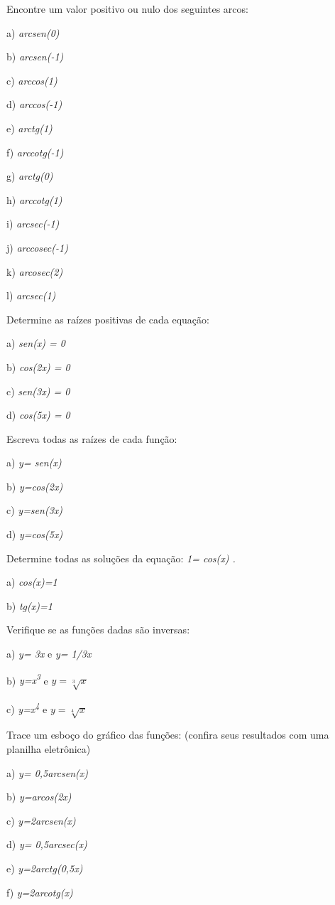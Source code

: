 \begin{exercicios}
\exitem{} Encontre um valor positivo ou nulo dos seguintes arcos:

\begin{multicols}{3}
a) \textit{arcsen(0)}

b) \textit{arcsen(-1)}

c) \textit{arccos(1)}

d) \textit{arccos(-1)}

e) \textit{arctg(1)}

f) \textit{arccotg(-1)}

g) \textit{arctg(0)}

h) \textit{arccotg(1)}

i) \textit{arcsec(-1)}

j) \textit{arccosec(-1)}

k) \textit{arcosec(2)}

l) \textit{arcsec(1)}
\end{multicols}

\exitem{} Determine as raízes positivas de cada equação:

a) \textit{sen(x) = 0}

b) \textit{cos(2x) = 0}

c) \textit{sen(3x) = 0}

d) \textit{cos(5x) = 0}

\exitem{} Escreva todas as raízes de cada função:

a)\textit{ y= sen(x)}

b)\textit{ y=cos(2x)}

c)\textit{ y=sen(3x)}

d)\textit{ y=cos(5x)}

\exitem{} Determine todas as soluções da equação: \textit{1= cos(x) .}

a)\textit{ cos(x)=1}

b)\textit{ tg(x)=1 }

\exitem{} Verifique se as funções dadas são inversas:

 a) \textit{y= 3x} e \textit{y= 1/3x  }
 
 b) \textit{y=x\textsuperscript{3}} e \(y=\sqrt[3]{x} \)
 
 c) \textit{y=x\textsuperscript{4}} e \( y=\sqrt[4]{x} \)  

\item Trace um esboço do gráfico das funções: (confira seus resultados com uma planilha eletrônica)

\begin{multicols}{2}
a) \textit{y= 0,5arcsen(x)}

b) \textit{y=arcos(2x)}

c) \textit{y=2arcsen(x)}

d) \textit{y= 0,5arcsec(x)}

e) \textit{y=2arctg(0,5x)}

f) \textit{y=2arcotg(x)}
\end{multicols}
\end{exercicios}

